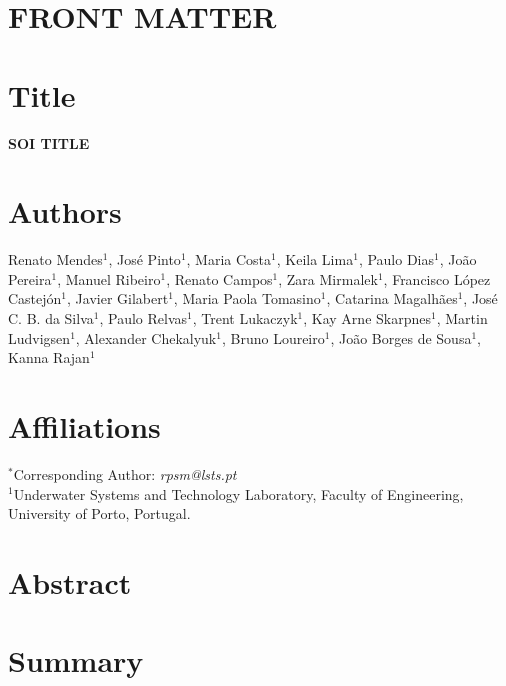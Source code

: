 \documentclass[12pt]{article}
\begin{document}
\section*{FRONT MATTER}

\section*{Title}
\textbf{SOI TITLE}

\section*{Authors}
Renato Mendes$^{1}$, José Pinto$^{1}$, Maria Costa$^{1}$, Keila Lima$^{1}$, Paulo Dias$^{1}$, Jo\~ao Pereira$^{1}$, Manuel Ribeiro$^{1}$, Renato Campos$^{1}$, Zara Mirmalek$^{1}$, Francisco L\'{o}pez Castej\'on$^{1}$, Javier Gilabert$^{1}$, Maria Paola Tomasino$^{1}$, Catarina Magalh\~aes$^{1}$, Jos\'e C. B. da Silva$^{1}$, Paulo Relvas$^{1}$, Trent Lukaczyk$^{1}$, Kay Arne Skarpnes$^{1}$, Martin Ludvigsen$^{1}$, Alexander Chekalyuk$^{1}$, Bruno Loureiro$^{1}$, Jo\~ao Borges de Sousa$^{1}$, Kanna Rajan$^{1}$

\section*{Affiliations}
$^{*}$Corresponding Author: \emph{rpsm@lsts.pt}\\
\noindent
$^{1}$Underwater Systems and Technology Laboratory, Faculty of Engineering,\\ University of Porto, Portugal.\\
\noindent



\section*{Abstract}


\section*{Summary}






\end{document}
